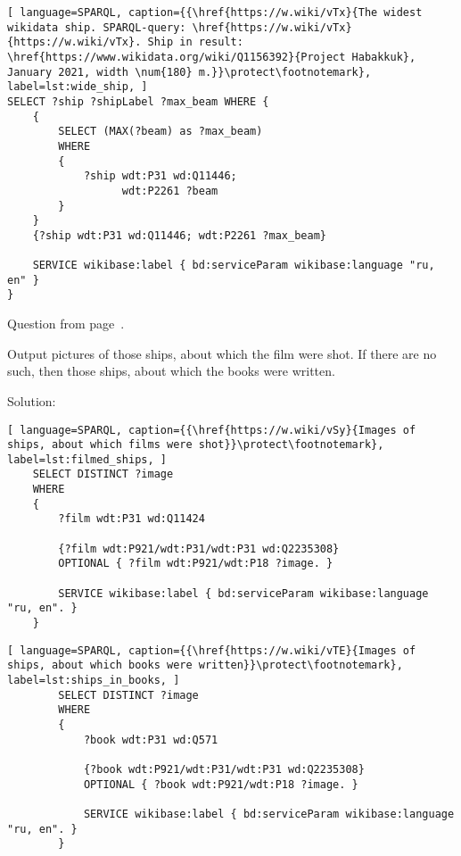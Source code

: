 \begin{lstlisting}[ language=SPARQL, caption={{\href{https://w.wiki/vTx}{The widest wikidata ship. SPARQL-query: \href{https://w.wiki/vTx}{https://w.wiki/vTx}. Ship in result: \href{https://www.wikidata.org/wiki/Q1156392}{Project Habakkuk}, January 2021, width \num{180} m.}}\protect\footnotemark}, label=lst:wide_ship, ]
SELECT ?ship ?shipLabel ?max_beam WHERE {
	{
		SELECT (MAX(?beam) as ?max_beam)
		WHERE
		{
			?ship wdt:P31 wd:Q11446;
				  wdt:P2261 ?beam
		}
	}
	{?ship wdt:P31 wd:Q11446; wdt:P2261 ?max_beam}
			
	SERVICE wikibase:label { bd:serviceParam wikibase:language "ru, en" }
}
\end{lstlisting}

\small{Question from page~\pageref{ship_tasks}.}


\begin{exercise}
	\label{answer:ship_ex_2}
	Output pictures of those ships, about which the film were shot. If there are no such, then those ships, about which the books were written.\\
\end{exercise}

Solution:
\begin{lstlisting}[ language=SPARQL, caption={{\href{https://w.wiki/vSy}{Images of ships, about which films were shot}}\protect\footnotemark}, label=lst:filmed_ships, ]
	SELECT DISTINCT ?image 
	WHERE
	{
		?film wdt:P31 wd:Q11424 
			  
		{?film wdt:P921/wdt:P31/wdt:P31 wd:Q2235308}
		OPTIONAL { ?film wdt:P921/wdt:P18 ?image. }
			
		SERVICE wikibase:label { bd:serviceParam wikibase:language "ru, en". }
	}
\end{lstlisting}


\begin{lstlisting}[ language=SPARQL, caption={{\href{https://w.wiki/vTE}{Images of ships, about which books were written}}\protect\footnotemark}, label=lst:ships_in_books, ]
		SELECT DISTINCT ?image
		WHERE
		{
			?book wdt:P31 wd:Q571
				  
			{?book wdt:P921/wdt:P31/wdt:P31 wd:Q2235308}
			OPTIONAL { ?book wdt:P921/wdt:P18 ?image. }
				
			SERVICE wikibase:label { bd:serviceParam wikibase:language "ru, en". }
		}
\end{lstlisting}

